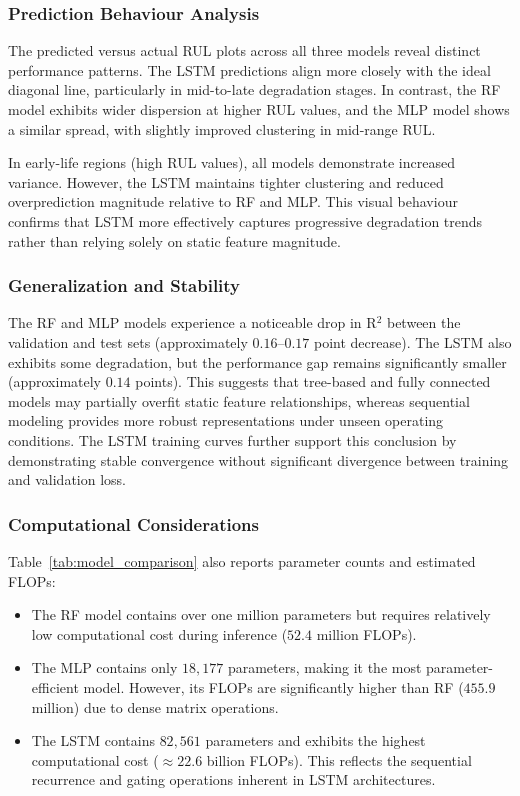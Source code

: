 \documentclass[conference]{IEEEtran}
\begin{document}
\subsubsection{Prediction Behaviour Analysis}
The predicted versus actual RUL plots across all three models reveal distinct performance patterns. The LSTM predictions align more closely with the ideal diagonal line, particularly in mid-to-late degradation stages. In contrast, the RF model exhibits wider dispersion at higher RUL values, and the MLP model shows a similar spread, with slightly improved clustering in mid-range RUL.

In early-life regions (high RUL values), all models demonstrate increased variance. However, the LSTM maintains tighter clustering and reduced overprediction magnitude relative to RF and MLP. This visual behaviour confirms that LSTM more effectively captures progressive degradation trends rather than relying solely on static feature magnitude.

\subsubsection{Generalization and Stability}
The RF and MLP models experience a noticeable drop in R$^2$ between the validation and test sets (approximately $0.16$--$0.17$ point decrease). The LSTM also exhibits some degradation, but the performance gap remains significantly smaller (approximately $0.14$ points). This suggests that tree-based and fully connected models may partially overfit static feature relationships, whereas sequential modeling provides more robust representations under unseen operating conditions. The LSTM training curves further support this conclusion by demonstrating stable convergence without significant divergence between training and validation loss.

\subsubsection{Computational Considerations}
Table~\ref{tab:model_comparison} also reports parameter counts and estimated FLOPs:
\begin{itemize}
    \item The RF model contains over one million parameters but requires relatively low computational cost during inference ($52.4$ million FLOPs).
    \item The MLP contains only $18,177$ parameters, making it the most parameter-efficient model. However, its FLOPs are significantly higher than RF ($455.9$ million) due to dense matrix operations.
    \item The LSTM contains $82,561$ parameters and exhibits the highest computational cost ($\approx 22.6$ billion FLOPs). This reflects the sequential recurrence and gating operations inherent in LSTM architectures.
\end{itemize}
\end{document}
